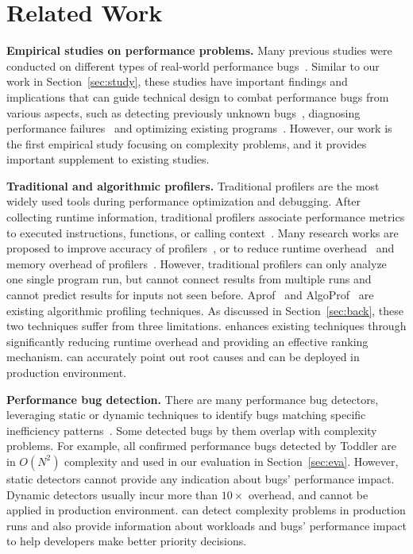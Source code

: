 
\section{Related Work}
\label{sec:related}

\noindent\textbf{Empirical studies on performance problems.}
Many previous studies were conducted on different types 
of real-world performance
bugs~\cite{PerfBug,SongOOPSLA2014,ldoctor,Zaman2012MSR,Nistor2013MSR,HuangRegression,SmartphoneStudy,junwen-1}.
Similar to our work in Section~\ref{sec:study},
these studies have important findings and 
implications 
that can guide technical design to combat
performance bugs from various aspects, 
such as detecting previously unknown bugs~\cite{PerfBug,SmartphoneStudy,junwen-1}, 
diagnosing performance failures~\cite{SongOOPSLA2014,ldoctor} 
and optimizing existing programs~\cite{junwen-2}. 
However, our work is the first empirical study focusing 
on complexity problems,
and it provides important supplement to existing studies.

\noindent\textbf{Traditional and algorithmic profilers.}
Traditional profilers are the most widely used tools
during performance optimization and debugging.
After collecting runtime information,
traditional profilers associate performance metrics to executed instructions,
functions, or calling context~\cite{oprofile,gprof,CCT}.
Many research works are proposed to improve
accuracy of profilers~\cite{4Profilers, LagHunter, AppInsight}, or
to reduce runtime overhead~\cite{AdaptiveBurst}
and memory overhead of profilers~\cite{HotCallingContext}.
However, traditional profilers can only analyze one single program run,
but cannot connect results from multiple runs and cannot
predict results for inputs not seen before.
Aprof~\cite{Aprof1, Aprof2} and AlgoProf~\cite{AlgoProf} are existing
algorithmic profiling techniques.
As discussed in Section~\ref{sec:back},
these two techniques suffer from three limitations. 
\Tool enhances existing techniques through significantly 
reducing runtime overhead and providing an effective ranking mechanism. 
\Tool can accurately point out root causes 
and can be deployed in production environment. 


\noindent\textbf{Performance bug detection.}
There are many performance bug detectors, 
leveraging static or dynamic techniques to
identify bugs matching specific inefficiency
patterns~\cite{yufei-perf,CLARITY,xiao13:context,PerfBug,Alabama,CARAMEL,XuDataStructure,XuBloatPLDI2009,XuBloatPLDI2010,Cachetor,LoopInvariant,falsesharing}.
Some detected bugs by them overlap with complexity problems.
For example, 
all confirmed performance bugs detected by Toddler are 
in $O(N^2)$ complexity and used in our evaluation in Section~\ref{sec:eva}.
However, static detectors cannot provide any indication
about bugs' performance impact.
Dynamic detectors usually incur more than $10\times$ overhead,
and cannot be applied in production environment.
\Tool can detect complexity problems in production runs 
and also provide information about workloads and bugs' performance impact 
to help developers make better priority decisions. 


